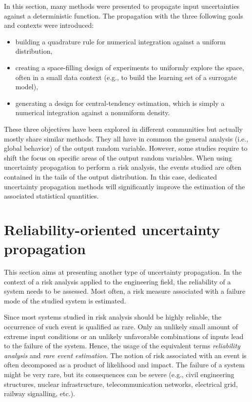 In this section, many methods were presented to propagate input uncertainties against a deterministic function.
The propagation with the three following goals and contexts were introduced: 
\begin{itemize}
    \item building a quadrature rule for numerical integration against a uniform distribution,
    \item creating a space-filling design of experiments to uniformly explore the space, often in a small data context (e.g., to build the learning set of a surrogate model),
    \item generating a design for central-tendency estimation, which is simply a numerical integration against a nonuniform density.
\end{itemize} 
These three objectives have been explored in different communities but actually mostly share similar methods. 
They all have in common the general analysis (i.e., global behavior) of the output random variable. 
However, some studies require to shift the focus on specific areas of the output random variables.
When using uncertainty propagation to perform a risk analysis, the events studied are often contained in the tails of the output distribution. 
In this case, dedicated uncertainty propagation methods will significantly improve the estimation of the associated statistical quantities.


\section{Reliability-oriented uncertainty propagation} \label{sec:reliability}

This section aims at presenting another type of uncertainty propagation. 
In the context of a risk analysis applied to the engineering field, the reliability of a system needs to be assessed. 
Most often, a risk measure associated with a failure mode of the studied system is estimated. 

Since most systems studied in risk analysis should be highly reliable, the occurrence of such event is qualified as rare. 
Only an unlikely small amount of extreme input conditions or an unlikely unfavorable combinations of inputs lead to the failure of the system. 
Hence, the usage of the equivalent terms \textit{reliability analysis} and \textit{rare event estimation}. 
The notion of risk associated with an event is often decomposed as a product of likelihood and impact. 
The failure of a system might be very rare, but its consequences can be severe (e.g., civil engineering structures, nuclear infrastructure, telecommunication networks, electrical grid, railway signalling, etc.).

